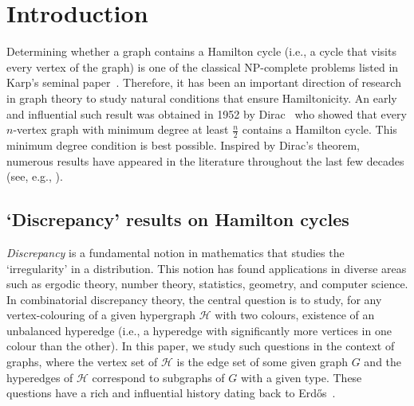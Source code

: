 \documentclass[10pt,a4paper,reqno]{amsart}
\begin{document}
\maketitle

\section{Introduction}
Determining whether a graph contains a Hamilton cycle (i.e., a cycle that visits every vertex of the graph) is one of the classical NP-complete problems listed in Karp's seminal paper~\cite{Karp1972reducibility}. Therefore, it has been an important direction of research in graph theory to study natural conditions that ensure Hamiltonicity. An early and influential such result was obtained in 1952 by Dirac~\cite{Dirac1952some} who showed that every $n$-vertex graph with minimum degree at least $\frac{n}{2}$ contains a Hamilton cycle. This minimum degree condition is best possible. Inspired by Dirac's theorem, numerous results have appeared in the literature throughout the last few decades (see, e.g., \cite{Bondy1995basic,Bottcher2009proof,Cuckler2009entropy,Cuckler2009hamilton,Krivelevich2014robust}). 



\subsection{`Discrepancy' results on Hamilton cycles}
\emph{Discrepancy} is a fundamental notion in mathematics that studies the `irregularity' in a distribution. This notion has found applications in diverse areas such as ergodic theory, number theory, statistics, geometry, and computer science.
In combinatorial discrepancy theory, the central question is to study, for any vertex-colouring of a given hypergraph $\mathcal{H}$ with two colours, existence of an unbalanced hyperedge (i.e., a hyperedge with significantly more vertices in one colour than the other).
In this paper, we study such questions in the context of graphs, where the vertex set of $\mathcal{H}$ is the edge set of some given graph $G$ and the hyperedges of $\mathcal{H}$ correspond to subgraphs of $G$ with a given type. These questions have a rich and influential history dating back to Erd\H{o}s~\cite{Erdos1995discrepancy,Erdos1971imbalances}.
\end{document}
